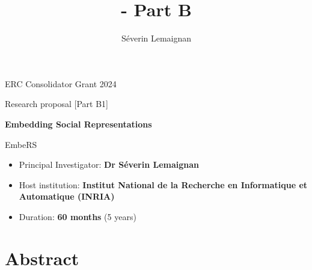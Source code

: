 \documentclass[11pt,a4paper]{report}
\title{\project - Part B}
\author{Séverin Lemaignan}
\newcommand{\project}{EmbeRS\xspace}
\newcommand{\eu}[1]{}
\begin{document}
\maketitle

\begin{center}
    ERC Consolidator Grant 2024

    Research proposal [Part B1]

    \vspace{2cm}

    \textbf{\LARGE Embedding Social Representations}

    \vspace{2cm}
    {\Huge \project}

\end{center}

    \vspace{2cm}

\begin{itemize}
    \item Principal Investigator: \textbf{Dr Séverin Lemaignan}
    \item Host institution: \textbf{Institut National de la Recherche en
        Informatique et Automatique (INRIA)}
    \item Duration: \textbf{60 months} (5 years)
\end{itemize}

\section*{Abstract}\label{abstract}

\eu{The abstract (summary) should, at a glance, provide the reader with a clear
understanding of the objectives of the research proposal and how they will be
achieved. The abstract will be used as the short description of your research
proposal in the evaluation process and in communications to contact in
particular the potential remote referees and/or inform the Commission and/or the
programme management committees and/or relevant national funding agencies
(provided you give permission to do so where requested in the online proposal
submission forms, section 1). It must therefore be short and precise and should
not contain confidential information. \\
Please use plain typed text, avoiding formulae and other special characters. The
abstract must be written in English. There is a limit of 2000 characters (spaces
and line breaks included).}
\end{document}
